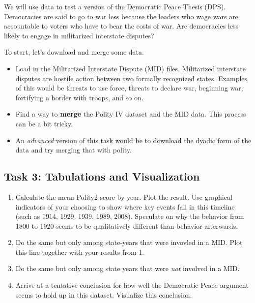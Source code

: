 \documentclass[]{book}
\providecommand{\tightlist}{%
  \setlength{\itemsep}{0pt}\setlength{\parskip}{0pt}}
\theoremstyle{definition}
\theoremstyle{definition}
\theoremstyle{definition}
\theoremstyle{remark}
\begin{document}
We will use data to test a version of the Democratic Peace Thesis (DPS). Democracies are said to go to war less because the leaders who wage wars are accountable to voters who have to bear the costs of war. Are democracies less likely to engage in militarized interstate disputes?

To start, let's download and merge some data.

\begin{itemize}
\tightlist
\item
  Load in the Militarized Interstate Dispute (MID) files. Militarized interstate disputes are hostile action between two formally recognized states. Examples of this would be threats to use force, threats to declare war, beginning war, fortifying a border with troops, and so on.
\item
  Find a way to \textbf{merge} the Polity IV dataset and the MID data. This process can be a bit tricky.
\item
  An \emph{advanced} version of this task would be to download the dyadic form of the data and try merging that with polity.
\end{itemize}

\hypertarget{task-3-tabulations-and-visualization}{%
\subsection*{Task 3: Tabulations and Visualization}\label{task-3-tabulations-and-visualization}}

\begin{enumerate}
\def\labelenumi{\arabic{enumi}.}
\tightlist
\item
  Calculate the mean Polity2 score by year. Plot the result. Use graphical indicators of your choosing to show where key events fall in this timeline (such as 1914, 1929, 1939, 1989, 2008). Speculate on why the behavior from 1800 to 1920 seems to be qualitatively different than behavior afterwards.
\item
  Do the same but only among state-years that were invovled in a MID. Plot this line together with your results from 1.
\item
  Do the same but only among state years that were \emph{not} involved in a MID.
\item
  Arrive at a tentative conclusion for how well the Democratic Peace argument seems to hold up in this dataset. Visualize this conclusion.
\end{enumerate}
\end{document}
